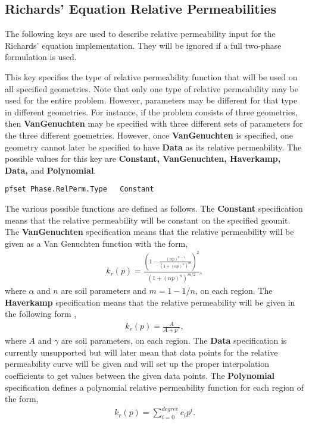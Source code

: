 \subsection{Richards' Equation Relative Permeabilities}
\label{Richards RelPerm}

The following keys are used to describe relative permeability input for the
Richards' equation implementation.  They will be ignored if a full two-phase
formulation is used.

{
This key specifies the type of relative permeability function that will be used
on all specified geometries.  Note that only one type of relative permeability
may be used for the entire problem.  However, parameters may be different for
that type in different geometries.  For instance, if the problem consists of
three geometries, then {\bf VanGenuchten} may be specified with three different
sets of parameters for the three different goemetries.  However, once {\bf
VanGenuchten} is specified, one geometry cannot later be specified to have {\bf
Data} as its relative permeability.  The possible values for this key
are {\bf Constant, VanGenuchten, Haverkamp, Data,} and {\bf  Polynomial}.
}
\begin{display}\begin{verbatim}
pfset Phase.RelPerm.Type   Constant
\end{verbatim}\end{display}

The various possible functions are defined as follows.
The {\bf Constant} specification means that the relative permeability will be
constant on the specified geounit.  The {\bf VanGenuchten} specification means
that the relative permeability will be given as a Van Genuchten function
\cite{VanGenuchten80} with the form,
\begin{eqnarray}
k_r(p) = \frac{(1 - \frac{(\alpha p)^{n-1}}{(1 + (\alpha p)^n)^m})^2}
{(1 + (\alpha p)^n)^{m/2}},
\end{eqnarray}
where $\alpha$ and $n$ are soil parameters and $m = 1 - 1/n$, on each region.
The {\bf Haverkamp} specification means that the relative permeability will be
given in the following form \cite{Haverkamp-Vauclin81},
\begin{eqnarray}
k_r(p) = \frac{A}{A + p^{\gamma}},
\end{eqnarray}
where $A$ and $\gamma$ are soil parameters, on each region.
The {\bf Data} specification is currently unsupported but will later mean that
data points for the relative permeability curve will be given and \parflow{}
will set up the proper interpolation coefficients to get values between the
given data points.
The {\bf Polynomial} specification
defines a polynomial relative permeability function for each
region of the form,
\begin{eqnarray}
k_r(p) = \sum_{i=0}^{degree} c_ip^i.
\end{eqnarray}

